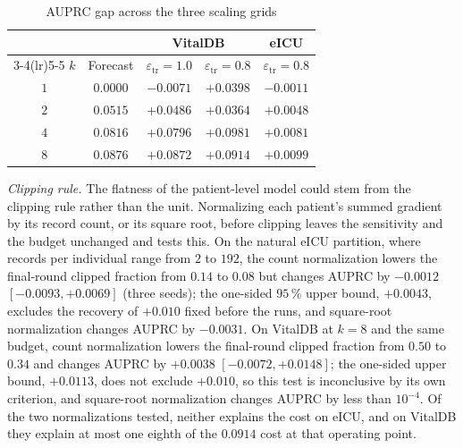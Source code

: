 \begin{table}[!t]
\centering
\caption{AUPRC gap across the three scaling grids}
\label{tab:matched}
\setlength{\tabcolsep}{3.5pt}
\small
\begin{tabular}{ccccc}
\toprule
 & & \multicolumn{2}{c}{VitalDB} & eICU \\
\cmidrule(lr){3-4}\cmidrule(lr){5-5}
$k$ & Forecast & $\varepsilon_{\mathrm{tr}}\!=\!1.0$ & $\varepsilon_{\mathrm{tr}}\!=\!0.8$ & $\varepsilon_{\mathrm{tr}}\!=\!0.8$ \\
\midrule
$1$ & $0.0000$ & $-0.0071$ & $+0.0398$ & $-0.0011$ \\
$2$ & $0.0515$ & $+0.0486$ & $+0.0364$ & $+0.0048$ \\
$4$ & $0.0816$ & $+0.0796$ & $+0.0981$ & $+0.0081$ \\
$8$ & $0.0876$ & $+0.0872$ & $+0.0914$ & $+0.0099$ \\
\bottomrule
\end{tabular}
\end{table}

\emph{Clipping rule.} The flatness of the patient-level model could stem from
the clipping rule rather than the unit. Normalizing each patient's summed
gradient by its record count, or its square root, before clipping leaves the
sensitivity and the budget unchanged and tests this. On the natural eICU
partition, where records per individual range from $2$ to $192$, the count
normalization lowers the final-round clipped fraction from $0.14$ to $0.08$
but changes AUPRC by $-0.0012$ $[-0.0093, +0.0069]$ (three seeds); the
one-sided $95\,\%$ upper bound, $+0.0043$, excludes the recovery of $+0.010$
fixed before the runs, and square-root normalization changes AUPRC by
$-0.0031$. On VitalDB at $k = 8$ and the same budget, count normalization
lowers the final-round clipped fraction from $0.50$ to $0.34$ and changes
AUPRC by $+0.0038$ $[-0.0072, +0.0148]$; the one-sided upper bound, $+0.0113$,
does not exclude $+0.010$, so this test is inconclusive by its own criterion,
and square-root normalization changes AUPRC by less than $10^{-4}$. Of the
two normalizations tested, neither explains the cost on eICU, and on VitalDB
they explain at most one eighth of the $0.0914$ cost at that operating point.

